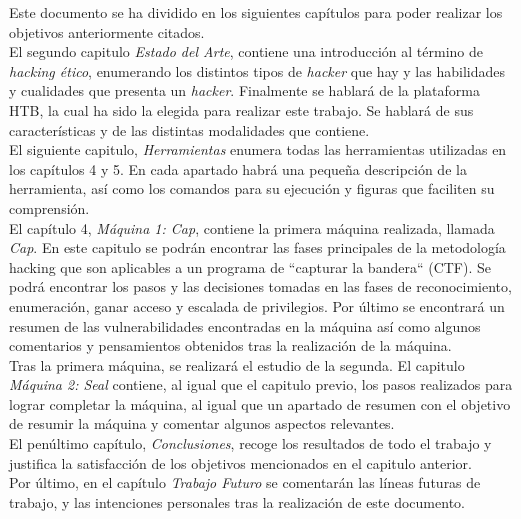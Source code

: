 Este documento se ha dividido en los siguientes capítulos para poder realizar los objetivos anteriormente citados.\\

El segundo capitulo \textit{Estado del Arte}, contiene una introducción al término de \textit{hacking ético}, enumerando los distintos tipos de \textit{hacker} que hay y las habilidades y cualidades que presenta un \textit{hacker}. Finalmente se hablará de la plataforma \acrlong{HTB}, la cual ha sido la elegida para realizar este trabajo. Se hablará de sus características y de las distintas modalidades que contiene.\\

El siguiente capitulo, \textit{Herramientas} enumera todas las herramientas utilizadas en los capítulos 4 y 5. En cada apartado habrá una pequeña descripción de la herramienta, así como los comandos para su ejecución y figuras que faciliten su comprensión.\\

El capítulo 4, \textit{Máquina 1: Cap}, contiene la primera máquina realizada, llamada \textit{Cap}. En este capitulo se podrán encontrar las fases principales de la metodología hacking que son aplicables a un programa de ``capturar la bandera`` (\acrlong{CTF}). Se podrá encontrar los pasos y las decisiones tomadas en las fases de reconocimiento, enumeración, ganar acceso y escalada de privilegios. Por último se encontrará un resumen de las vulnerabilidades encontradas en la máquina así como algunos comentarios y pensamientos obtenidos tras la realización de la máquina.\\

Tras la primera máquina, se realizará el estudio de la segunda. El capitulo \textit{Máquina 2: Seal} contiene, al igual que el capitulo previo, los pasos realizados para lograr completar la máquina, al igual que un apartado de resumen con el objetivo de resumir la máquina y comentar algunos aspectos relevantes.\\

El penúltimo capítulo, \textit{Conclusiones}, recoge los resultados de todo el trabajo y justifica la satisfacción de los objetivos mencionados en el capitulo anterior.\\

Por último, en el capítulo \textit{Trabajo Futuro} se comentarán las líneas futuras de trabajo, y las intenciones personales tras la realización de este documento.
